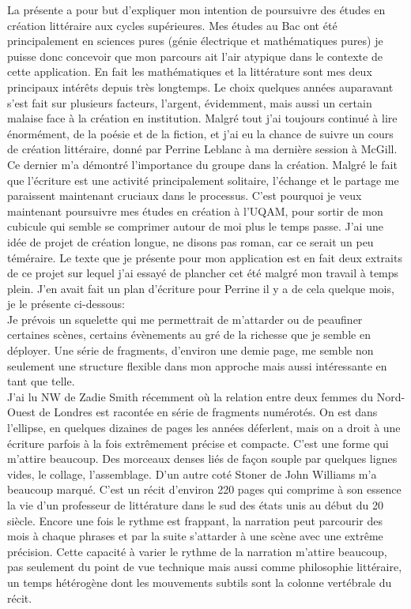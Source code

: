 


La présente a pour but d'expliquer mon intention de poursuivre des études
en création littéraire aux cycles supérieures. Mes études au 
Bac ont été principalement en sciences pures (génie électrique et mathématiques
pures) je puisse donc concevoir que mon parcours ait l'air atypique dans le 
contexte de cette application. En fait les mathématiques et la littérature sont
mes deux principaux intérêts depuis très longtemps. Le choix quelques années 
auparavant s'est fait sur plusieurs facteurs, l'argent, évidemment, mais 
aussi un certain malaise face à la création en institution. Malgré tout
j'ai toujours continué à lire énormément, de la poésie et de la fiction, 
et j'ai eu la chance de suivre un cours de création littéraire, donné
par Perrine Leblanc à ma dernière session à McGill. Ce dernier m'a démontré
l'importance du groupe dans la création. Malgré le fait que l'écriture
est une activité principalement solitaire, l'échange et le partage
me paraissent maintenant cruciaux dans le processus. C'est pourquoi
je veux maintenant poursuivre mes études en création à l'UQAM, pour 
sortir de mon cubicule qui semble se comprimer autour de moi plus le temps
passe. J'ai une idée de projet de création longue, ne disons pas roman,
car ce serait un peu téméraire. Le texte que je présente pour mon application
est en fait deux extraits de ce projet sur lequel j'ai essayé de plancher 
cet été malgré mon travail à temps plein. J'en avait fait un plan d'écriture
pour Perrine il y a de cela quelque mois, je le présente ci-dessous:\\



Je prévois un squelette qui me permettrait
de m'attarder ou de peaufiner certaines scènes, certains évènements au gré de la
richesse que je semble en déployer. Une série de fragments, d'environ une demie
page, me semble non seulement une structure flexible dans mon approche mais
aussi intéressante en tant que telle. \\

J'ai lu NW de Zadie Smith récemment où la relation entre deux femmes du
Nord-Ouest de Londres est racontée en série de fragments numérotés. On est dans
l'ellipse, en quelques dizaines de pages les années déferlent, mais on a droit
à une écriture parfois à la fois extrêmement précise et compacte.  C'est une
forme qui m'attire beaucoup. Des morceaux denses liés de façon souple par
quelques lignes vides, le collage, l'assemblage. D'un autre coté Stoner de John
Williams m'a beaucoup marqué. C'est un récit d'environ 220 pages qui comprime à
son essence la vie d'un professeur de littérature dans le sud des états unis au
début du 20 siècle. Encore une fois le rythme est frappant, la narration peut
parcourir des mois à chaque phrases et par la suite s'attarder à une scène avec
une extrême précision. Cette capacité à varier le rythme de la narration
m'attire beaucoup, pas seulement du point de vue technique mais aussi comme
philosophie littéraire, un temps hétérogène dont les mouvements subtils sont la
colonne vertébrale du récit.\\

